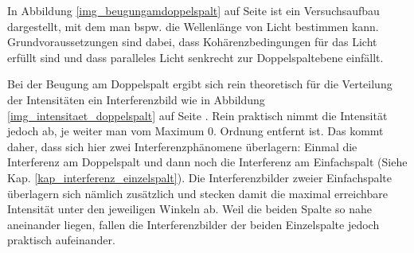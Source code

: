 In Abbildung \ref{img_beugungamdoppelspalt} auf Seite \pageref{img_beugungamdoppelspalt} ist ein Versuchsaufbau dargestellt, mit dem man bspw. die Wellenlänge von Licht bestimmen kann. Grundvoraussetzungen sind dabei, dass Kohärenzbedingungen für das Licht erfüllt sind und dass paralleles Licht senkrecht zur Doppelspaltebene einfällt.

Bei der Beugung am Doppelspalt ergibt sich rein theoretisch für die Verteilung der Intensitäten ein Interferenzbild wie in Abbildung \ref{img_intensitaet_doppelspalt} auf Seite \pageref{img_intensitaet_doppelspalt}. Rein praktisch nimmt die Intensität jedoch ab, je weiter man vom Maximum 0. Ordnung entfernt ist. Das kommt daher, dass sich hier zwei Interferenzphänomene überlagern: Einmal die Interferenz am Doppelspalt und dann noch die Interferenz am Einfachspalt (Siehe Kap. \ref{kap_interferenz_einzelspalt}). Die Interferenzbilder zweier Einfachspalte überlagern sich nämlich zusätzlich und stecken damit die maximal erreichbare Intensität unter den jeweiligen Winkeln ab. Weil die beiden Spalte so nahe aneinander liegen, fallen die Interferenzbilder der beiden Einzelspalte jedoch praktisch aufeinander.




